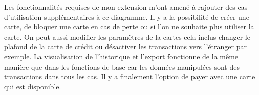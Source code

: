 \documentclass{article}
\begin{document}
Les fonctionnalités requises de mon extension m'ont amené à rajouter
des cas d'utilisation supplémentaires à ce diagramme. Il y a la possibilité
de créer une carte, de bloquer une carte en cas de perte ou si l'on ne souhaite plus utiliser
la carte. On peut aussi modifier les paramètres de la cartes cela inclus changer le plafond de
la carte de crédit ou désactiver les transactions vers l'étranger par exemple. La
visualisation de l'historique et l'export fonctionne de la même manière que dans les fonctions
de base car les données manipulées sont des transactions dans tous les cas.
Il y a finalement l'option de payer avec une carte qui est disponible.
\end{document}
